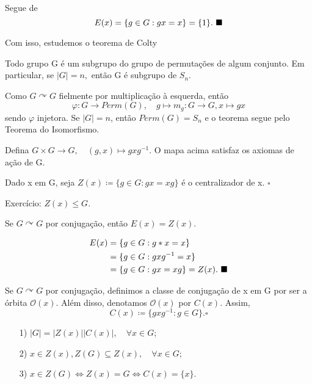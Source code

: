 \documentclass[Algebra/algebra_notes.tex]{subfiles}
\begin{document}
\begin{proof*}
	Segue de
	\[
		E(x) = \{g\in G: gx = x\} = \{1\}. \text{ $\blacksquare$}
	\]
\end{proof*}
Com isso, estudemos o teorema de Colty
\hypertarget{colty}{\begin{theorem*}
		Todo grupo G é um subgrupo do grupo de permutações de algum conjunto. Em particular,
		se \(|G| = n,\) então G é subgrupo de \(S_{n}\).
	\end{theorem*}}
\begin{proof*}
	Como \(G \curvearrowright G\) fielmente por multiplicação à esquerda, então
	\[
		\varphi :G\rightarrow Perm(G),\quad g\mapsto m_{g}:G\rightarrow G, x\mapsto gx
	\]
	sendo \(\varphi \) injetora. Se \(|G|=n\), então \(Perm(G) = S_{n}\) e o teorema
	segue pelo Teorema do Isomorfismo.
\end{proof*}
\begin{example*}
	Defina \(G\times{G}\rightarrow G, \quad (g, x)\mapsto gxg^{-1}\). O mapa acima satisfaz
	os axiomas de ação de G.
\end{example*}
\begin{def*}
	Dado x em G, seja \(Z(x)\coloneqq \{g\in G: gx=xg\}\) é o centralizador de x. \(\square\)
\end{def*}
\begin{example*}
	Exercício: \(Z(x)\leq G\).
\end{example*}
\begin{prop*}
	Se \(G \curvearrowright G\) por conjugação, então \(E(x) = Z(x)\).
\end{prop*}
\begin{proof*}
	\begin{align*}
		E(x) & = \{g\in G: g * x = x\}                         \\
		     & = \{g\in G: gxg^{-1} = x\}                      \\
		     & = \{g\in G: gx = xg\} = Z(x).\text{ $\blacksquare$}
	\end{align*}
\end{proof*}
\begin{def*}
	Se \(G \curvearrowright G\) por conjugação, definimos a classe de conjugação
	de x em G por ser a órbita \(\mathcal{O}(x)\). Além disso, denotamos \(\mathcal{O}(x)\) por
	\(C(x).\) Assim,
	\[
		C(x)\coloneqq \{gxg^{-1}: g\in G\}. \square
	\]
\end{def*}
\begin{prop*}
	\begin{itemize}
		\item[1)] \(|G| = |Z(x)||C(x)|,\quad \forall x\in G\);
		\item[2)] \(x\in Z(x), Z(G)\subseteq{Z(x)}, \quad \forall x\in G\);
		\item[3)] \(x\in Z(G) \Longleftrightarrow Z(x) = G \Longleftrightarrow C(x) = \{x\}\).
	\end{itemize}
\end{prop*}
\end{document}
